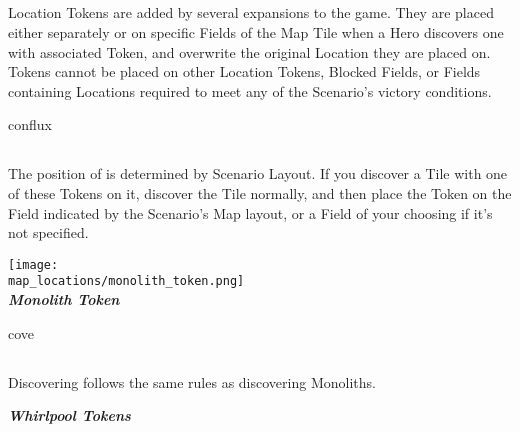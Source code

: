 \begin{multicols}{2}
\subsection*{}
Location Tokens are added by several expansions to the game.
They are placed either separately or on specific Fields of the Map Tile when a Hero discovers one with associated Token, and overwrite the original Location they are placed on.
Tokens cannot be placed on other Location Tokens, Blocked Fields, or Fields containing Locations required to meet any of the Scenario's victory conditions.

\begin{expansion}[before=\vspace*{0pt}]{conflux}
  \subsection*{}
   The position of  is determined by Scenario Layout.
   If you discover a Tile with one of these Tokens on it, discover the Tile normally, and then place the Token on the Field indicated by the Scenario's Map layout, or a Field of your choosing if it's not specified.
  \bigskip
  \begin{center}
    \texttt{[image: \\map\_locations/monolith\_token.png]}\\
    \footnotesize{\textbf{\textit{\textcolor{darkcandyapplered}{Monolith Token}}}}
  \end{center}
\end{expansion}

\bigskip

\begin{expansion}[before=\vspace*{0pt}]{cove}
  \subsection*{}
  Discovering  follows the same rules as discovering Monoliths.
  \bigskip

  \begin{center}
    \footnotesize{\textbf{\textit{\textcolor{darkcandyapplered}{Whirlpool Tokens}}}}
  \end{center}
\end{expansion}


\end{multicols}
